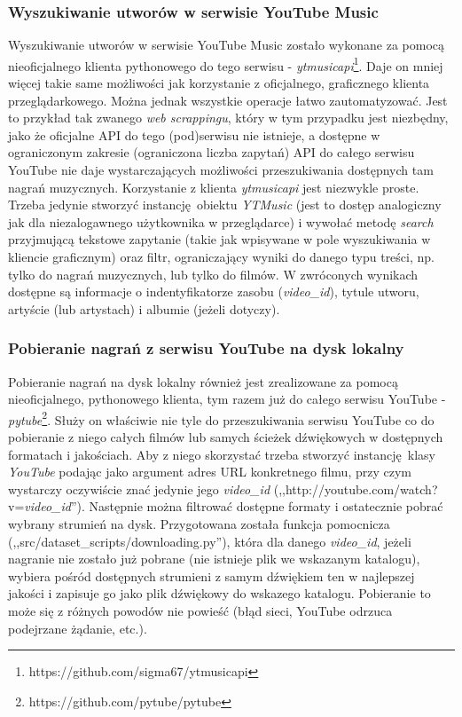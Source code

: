 \subsubsection{Wyszukiwanie utworów w serwisie YouTube Music}
Wyszukiwanie utworów w serwisie YouTube Music zostało wykonane za pomocą nieoficjalnego klienta
pythonowego do tego serwisu - \emph{ytmusicapi}\footnote{https://github.com/sigma67/ytmusicapi}.
Daje on mniej więcej takie same możliwości jak korzystanie z oficjalnego, graficznego klienta
przeglądarkowego. Można jednak wszystkie operacje łatwo zautomatyzować. Jest to przykład tak zwanego
\emph{web scrappingu}, który w tym przypadku jest niezbędny, jako że oficjalne API do tego (pod)serwisu
nie istnieje, a dostępne w ograniczonym zakresie (ograniczona liczba zapytań) API do całego serwisu
YouTube nie daje wystarczających możliwości przeszukiwania dostępnych tam nagrań muzycznych.
Korzystanie z klienta \emph{ytmusicapi} jest niezwykle proste. Trzeba jedynie stworzyć
instancję obiektu \emph{YTMusic} (jest to dostęp analogiczny jak dla niezalogawnego użytkownika w
przeglądarce) i wywołać metodę \emph{search} przyjmującą tekstowe zapytanie (takie jak wpisywane w
pole wyszukiwania w kliencie graficznym) oraz filtr, ograniczający wyniki do danego typu treści, np.
tylko do nagrań muzycznych, lub tylko do filmów. W zwróconych wynikach dostępne są informacje o
indentyfikatorze zasobu (\emph{video\_id}), tytule utworu, artyście (lub artystach) i albumie
(jeżeli dotyczy).

\subsubsection{Pobieranie nagrań z serwisu YouTube na dysk lokalny}
Pobieranie nagrań na dysk lokalny również jest zrealizowane za pomocą nieoficjalnego, pythonowego
klienta, tym razem już do całego serwisu YouTube -
\emph{pytube}\footnote{https://github.com/pytube/pytube}. Służy on właściwie nie tyle do
przeszukiwania serwisu YouTube co do pobieranie z niego całych filmów lub samych ścieżek dźwiękowych
w dostępnych formatach i jakościach. Aby z niego skorzystać trzeba stworzyć instancję klasy
\emph{YouTube} podając jako argument adres URL konkretnego filmu, przy czym wystarczy oczywiście
znać jedynie jego \emph{video\_id} (,,http://youtube.com/watch?v=\emph{video\_id}''). Następnie
można filtrować dostępne formaty i ostatecznie pobrać wybrany strumień na dysk. Przygotowana została
funkcja pomocnicza (,,src/dataset\_scripts/downloading.py''), która dla danego \emph{video\_id},
jeżeli nagranie nie zostało już pobrane (nie istnieje plik we wskazanym katalogu), wybiera pośród
dostępnych strumieni z samym dźwiękiem ten w najlepszej jakości i zapisuje go jako plik dźwiękowy do
wskazego katalogu. Pobieranie to może się z różnych powodów nie powieść (błąd sieci, YouTube odrzuca
podejrzane żądanie, etc.).

